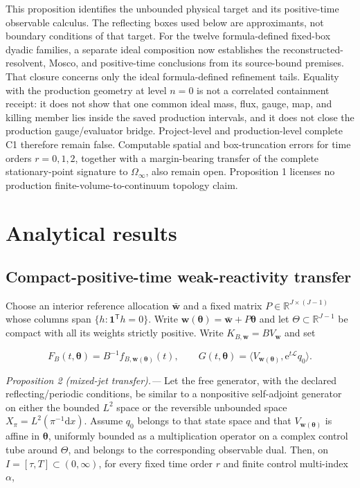 \documentclass[aps,physrev,reprint,amsmath,amssymb,longbibliography,floatfix]{revtex4-2}
\newcommand{\dd}{\mathrm d}
\newcommand{\e}{\mathrm e}
\begin{document}
This proposition identifies the unbounded physical target and its
positive-time observable calculus.  The reflecting boxes used below are
approximants, not boundary conditions of that target.  For the twelve
formula-defined fixed-box dyadic families, a separate ideal composition now
establishes the reconstructed-resolvent, Mosco, and positive-time conclusions
from its source-bound premises.  That closure concerns only the ideal
formula-defined refinement tails.  Equality with the production geometry at
level \(n=0\) is not a correlated containment receipt: it does not show that
one common ideal mass, flux, gauge, map, and killing member lies inside the
saved production intervals, and it does not close the production
gauge/evaluator bridge.  Project-level and production-level complete C1
therefore remain false.  Computable spatial and box-truncation errors for time
orders \(r=0,1,2\), together with a margin-bearing transfer of the complete
stationary-point signature to \(\Omega_\infty\), also remain open.  Proposition
1 licenses no production finite-volume-to-continuum topology claim.

\section{Analytical results}
\label{sec:analysis}

\subsection{Compact-positive-time weak-reactivity transfer}

Choose an interior reference allocation $\bar{\bm w}$ and a fixed matrix
$P\in\mathbb R^{J\times(J-1)}$ whose columns span
$\{h:\bm1^{\mathsf T}h=0\}$.  Write
$\bm w(\bm\theta)=\bar{\bm w}+P\bm\theta$ and let
$\Theta\subset\mathbb R^{J-1}$ be compact with all its weights strictly
positive.  Write $K_{B,\bm w}=B V_{\bm w}$ and set

\begin{equation}
 F_B(t,\bm\theta)=B^{-1}f_{B,\bm w(\bm\theta)}(t),\qquad
 G(t,\bm\theta)=
 \langle V_{\bm w(\bm\theta)},\e^{t\mathcal L}q_0\rangle.
 \label{eq:normalized-free-exposure}
\end{equation}

\noindent\textit{Proposition 2 (mixed-jet transfer).---}
Let the free generator, with the declared reflecting/periodic conditions, be
similar to a nonpositive self-adjoint generator on either the bounded
$L^2$ space or the reversible unbounded space
$X_\pi=L^2(\pi^{-1}\dd x)$.  Assume $q_0$ belongs to that state space and that
$V_{\bm w(\bm\theta)}$ is affine in $\bm\theta$, uniformly bounded as a
multiplication operator on a complex control tube around $\Theta$, and belongs
to the corresponding observable dual.  Then, on
$I=[\tau,T]\subset(0,\infty)$, for every fixed time order $r$ and finite
control multi-index $\alpha$,
\end{document}
